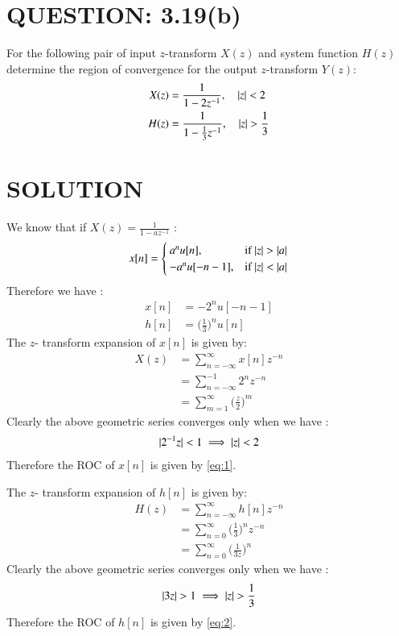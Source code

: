 \documentclass[journal,12pt,twocolumn]{IEEEtran}
\begin{document}
\section{QUESTION: 3.19(b)}
For the following pair of input $z$-transform $X(z)$ and system function $H(z)$ determine the region of convergence for the output $z$-transform $Y(z)$:
\begin{align}
X(z) &= \frac{1}{1-2z^{-1}}, \quad \vert z\vert < 2 \nonumber \\
H(z) &= \frac{1}{1-\frac{1}{3}z^{-1}}, \quad \vert z\vert > \frac{1}{3} \nonumber
\end{align}
\section{SOLUTION}
We know that if $X(z) = \frac{1}{1-az^{-1}}$ :
\begin{align}
x[n]=  
\begin{cases}
a^{n}u[n], & \text{if } \vert z\vert > \vert a\vert \\
-a^{n}u[-n-1], & \text{if } \vert z\vert < \vert a\vert \nonumber
\end{cases}
\end{align}
Therefore we have :
\begin{align}
x[n] &= -2^{n}u[-n-1] \\
h[n] &= \Bigg(\frac{1}{3}\Bigg)^{n}u[n]
\end{align}
The $z$- transform expansion of $x[n]$ is given by:
\begin{align}
X(z) &= \sum_{n=-\infty}^{\infty}x[n]z^{-n} \\
&= \sum_{n=-\infty}^{-1}2^{n}z^{-n} \\
&= \sum_{m=1}^{\infty}\Bigg(\frac{z}{2}\Bigg)^{m}
\end{align}
Clearly the above geometric series converges only when we have :
\begin{align}
\vert2^{-1}z\vert < 1 \implies \vert z\vert < 2 \label{eq:1}
\end{align}
Therefore the ROC of $x[n]$ is given by \eqref{eq:1}.

The $z$- transform expansion of $h[n]$ is given by:
\begin{align}
H(z) &= \sum_{n=-\infty}^{\infty}h[n]z^{-n} \\
&= \sum_{n=0}^{\infty}\Bigg(\frac{1}{3}\Bigg)^{n}z^{-n} \\
&= \sum_{n=0}^{\infty}\Bigg(\frac{1}{3z}\Bigg)^{n}
\end{align}
Clearly the above geometric series converges only when we have :
\begin{align}
\vert3z\vert > 1 \implies \vert z\vert > \frac{1}{3} \label{eq:2}
\end{align}
Therefore the ROC of $h[n]$ is given by \eqref{eq:2}.
\end{document}
